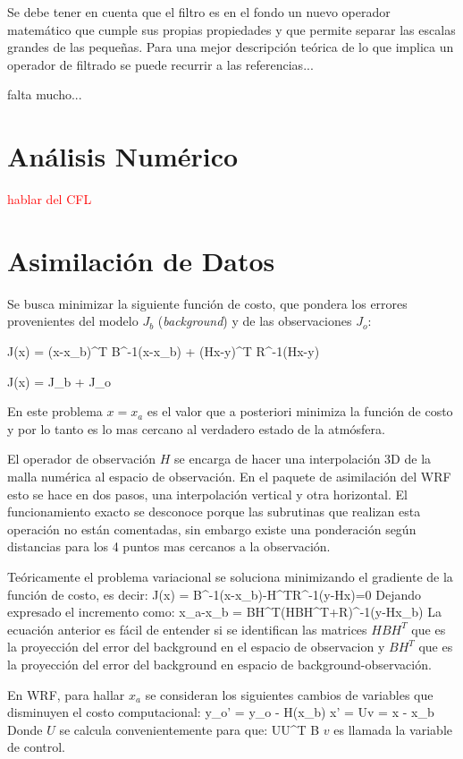 Se debe tener en cuenta que el filtro es en el fondo un nuevo operador matemático que cumple sus propias propiedades y que permite separar las escalas grandes de las pequeñas. Para una mejor descripción teórica de lo que implica un operador de filtrado se puede recurrir a las referencias...

falta mucho...
\section{Análisis Numérico}
\textcolor{red}{hablar del CFL}
\section{Asimilación de Datos}
Se busca minimizar la siguiente función de costo, que pondera los errores provenientes del modelo $J_b$ (\emph{background}) y de las observaciones $J_o$:

\be 
J(x) = (x-x_b)^T B^{-1}(x-x_b) + (Hx-y)^T R^{-1}(Hx-y)
\ee 

\be 
J(x) = J_b + J_o
\ee 

En este problema $x=x_a$ es el valor que a posteriori minimiza la función de costo y por lo tanto es lo mas cercano al verdadero estado de la atmósfera.

El operador de observación $H$ se encarga de hacer una interpolación 3D de la malla numérica al espacio de observación. En el paquete de asimilación del WRF esto se hace en dos pasos, una interpolación vertical y otra horizontal. El funcionamiento exacto se desconoce porque las subrutinas que realizan esta operación no están comentadas, sin embargo existe una ponderación según distancias para los 4 puntos mas cercanos a la observación. 

Teóricamente el problema variacional se soluciona minimizando el gradiente de la función de costo, es decir:
\be 
\nabla J(x) = B^{-1}(x-x_b)-H^TR^{-1}(y-Hx)=0
\ee
Dejando expresado el incremento como:
\be 
x_a-x_b = BH^T(HBH^T+R)^{-1}(y-Hx_b)
\ee
La ecuación anterior es fácil de entender si se identifican las matrices $HBH^T$ que es la proyección del error del background en el espacio de observacion y $BH^T$ que es la proyección del error del background en espacio de background-observación.
\bigskip

En WRF, para hallar $x_a$ se consideran los siguientes cambios de variables que disminuyen el costo computacional:
\be 
y_o' = y_o - H(x_b)
\ee 
\be 
x' = Uv = x - x_b
\ee
Donde $U$ se calcula convenientemente para que:
\be 
UU^T \approx B
\ee
$v$ es llamada la variable de control.

